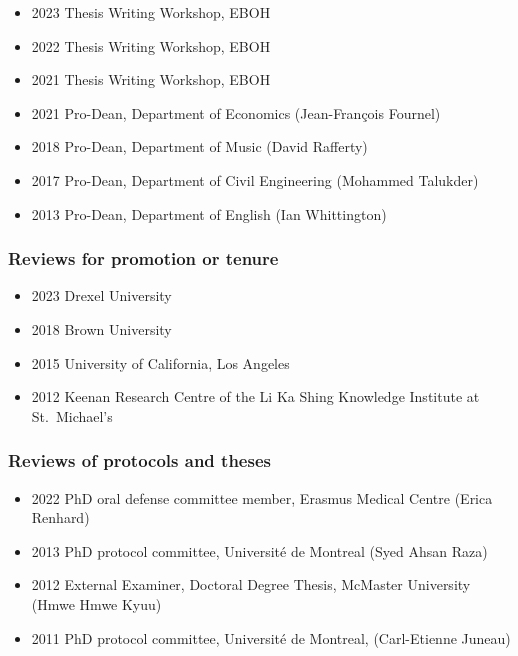 \documentclass[
  letterpaper,
  DIV=11,
  numbers=noendperiod]{scrartcl}
\providecommand{\tightlist}{%
  \setlength{\itemsep}{0pt}\setlength{\parskip}{0pt}}\usepackage{longtable,booktabs,array}
\begin{document}
\begin{itemize}
\tightlist
\item
  2023 Thesis Writing Workshop, EBOH
\item
  2022 Thesis Writing Workshop, EBOH
\item
  2021 Thesis Writing Workshop, EBOH
\item
  2021 Pro-Dean, Department of Economics (Jean-François Fournel)
\item
  2018 Pro-Dean, Department of Music (David Rafferty)
\item
  2017 Pro-Dean, Department of Civil Engineering (Mohammed Talukder)
\item
  2013 Pro-Dean, Department of English (Ian Whittington)
\end{itemize}

\hypertarget{reviews-for-promotion-or-tenure}{%
\subsubsection{Reviews for promotion or
tenure}\label{reviews-for-promotion-or-tenure}}

\begin{itemize}
\tightlist
\item
  2023 Drexel University
\item
  2018 Brown University
\item
  2015 University of California, Los Angeles
\item
  2012 Keenan Research Centre of the Li Ka Shing Knowledge Institute at
  St.~Michael's
\end{itemize}

\hypertarget{reviews-of-protocols-and-theses}{%
\subsubsection{Reviews of protocols and
theses}\label{reviews-of-protocols-and-theses}}

\begin{itemize}
\tightlist
\item
  2022 PhD oral defense committee member, Erasmus Medical Centre (Erica
  Renhard)
\item
  2013 PhD protocol committee, Université de Montreal (Syed Ahsan Raza)
\item
  2012 External Examiner, Doctoral Degree Thesis, McMaster University
  (Hmwe Hmwe Kyuu)
\item
  2011 PhD protocol committee, Université de Montreal, (Carl-Etienne
  Juneau)
\end{itemize}
\end{document}
